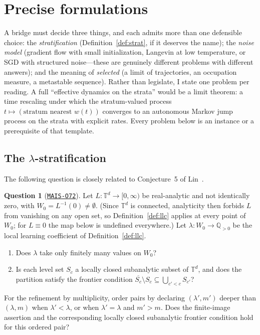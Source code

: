 \documentclass[11pt]{amsart}
\newcommand{\Oid}[1]{\href{https://github.com/lionellevine/MAIS/blob/main/open-problems/MAIS-O#1.md}{\texttt{MAIS-O#1}}}
\theoremstyle{plain}
\theoremstyle{definition}
\newtheorem{question}[theorem]{Question}
\newcommand{\Q}{\mathbb{Q}}
\newcommand{\T}{\mathbb{T}}
\begin{document}
\section{Precise formulations}\label{sec:precise}

A bridge must decide three things, and each admits more than one defensible choice: the \emph{stratification} (Definition~\ref{def:strat}, if it deserves the name); the \emph{noise model} (gradient flow with small initialization, Langevin at low temperature, or SGD with structured noise---these are genuinely different problems with different answers); and the meaning of \emph{selected} (a limit of trajectories, an occupation measure, a metastable sequence). Rather than legislate, I state one problem per reading. A full ``effective dynamics on the strata'' would be a limit theorem: a time rescaling under which the stratum-valued process $t \mapsto (\text{stratum nearest } w(t))$ converges to an autonomous Markov jump process on the strata with explicit rates. Every problem below is an instance or a prerequisite of that template.

\subsection{The \texorpdfstring{$\lambda$}{lambda}-stratification}\label{sec:strat-problem}

The following question is closely related to Conjecture~5 of Lin~\cite{lin2017}.

\begin{question}[\Oid{72}]\label{q:strat}
Let $L\colon \T^d \to [0,\infty)$ be real-analytic and not identically zero, with $W_0 = L^{-1}(0) \neq \emptyset$. (Since $\T^d$ is connected, analyticity then forbids $L$ from vanishing on any open set, so Definition~\ref{def:llc} applies at every point of $W_0$; for $L \equiv 0$ the map below is undefined everywhere.) Let $\lambda\colon W_0 \to \Q_{>0}$ be the local learning coefficient of Definition~\ref{def:llc}.
\begin{enumerate}
\item[(a)] Does $\lambda$ take only finitely many values on $W_0$?
\item[(b)] Is each level set $S_c$ a locally closed subanalytic subset of $\T^d$, and does the partition satisfy the frontier condition $\overline{S_c} \setminus S_c \subseteq \bigcup_{c' < c} S_{c'}$?
\end{enumerate}
For the refinement by multiplicity, order pairs by declaring $(\lambda',m')$ deeper than $(\lambda,m)$ when $\lambda'<\lambda$, or when $\lambda'=\lambda$ and $m'>m$. Does the finite-image assertion and the corresponding locally closed subanalytic frontier condition hold for this ordered pair?
\end{question}
\end{document}
